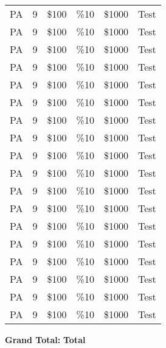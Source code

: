 \documentclass{article}%
\begin{document}
\begin{longtabu}{X[r] X[r] X[r] X[r] X[r] X[r]}
PA&9&\$100&\%10&\$1000&Test\\%
PA&9&\$100&\%10&\$1000&Test\\%
PA&9&\$100&\%10&\$1000&Test\\%
PA&9&\$100&\%10&\$1000&Test\\%
PA&9&\$100&\%10&\$1000&Test\\%
PA&9&\$100&\%10&\$1000&Test\\%
PA&9&\$100&\%10&\$1000&Test\\%
PA&9&\$100&\%10&\$1000&Test\\%
PA&9&\$100&\%10&\$1000&Test\\%
PA&9&\$100&\%10&\$1000&Test\\%
PA&9&\$100&\%10&\$1000&Test\\%
PA&9&\$100&\%10&\$1000&Test\\%
PA&9&\$100&\%10&\$1000&Test\\%
PA&9&\$100&\%10&\$1000&Test\\%
PA&9&\$100&\%10&\$1000&Test\\%
PA&9&\$100&\%10&\$1000&Test\\%
PA&9&\$100&\%10&\$1000&Test\\%
PA&9&\$100&\%10&\$1000&Test\\%
\end{longtabu}%
\textbf{Grand Total:}%
\hfill%
\textbf{Total}%
\end{document}
